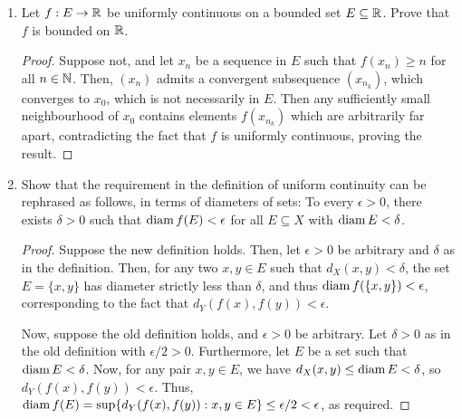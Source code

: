 \begin{enumerate}
\begin{proof}
    Notice that $\frac{ab}{a^2 + b^2} \le \frac{1}{2}$ since $(a - b)^2 = a^2 - 2ab + b^2 \ge 0$ for any $a, b$. Thus $f$ is bounded. Now, we have $g(1/n^3, 1/n) = n/2$ so $g$ is unbounded in any neighbourhood of $(0, 0)$. Finally, $f(1/n^2, 1/n) = 1/2$ for any $n$, so $f$ is discontinuous at $(0, 0)$. 

    However, if $x = cy$, $f(cy, y) = \frac{cy^3}{c^2y^2 + y^4} = \frac{cy}{c^2 + y^2} \to 0$ as $y \to 0$, so $f$ is continuous on the line $x = cy$. On any other line not passing through $(0, 0)$, the restriction is purely within the domain of the continuous definition. Similarly, $g(cy, y) = \frac{cy}{c^2 + y^4} \to 0$ as $y \to 0$, so $g$ is continuous on any straight line.
\end{proof}

\item %
    Let $f: E \rightarrow \mathbb{R}$ be uniformly continuous on a bounded set $E \subseteq \mathbb{R}$. Prove that $f$ is bounded on $\mathbb{R}$.
\begin{proof}
    Suppose not, and let $x_n$ be a sequence in $E$ such that $f(x_n) \ge n$ for all $n \in \mathbb{N}$. Then, $(x_n)$ admits a convergent subsequence $(x_{n_k})$, which converges to $x_0$, which is not necessarily in $E$. Then any sufficiently small neighbourhood of $x_0$ contains elements $f(x_{n_k})$ which are arbitrarily far apart, contradicting the fact that $f$ is uniformly continuous, proving the result.
\end{proof}

\item %
Show that the requirement in the definition of uniform continuity can be rephrased as follows, in terms of diameters of sets: To every $\epsilon > 0$, there exists $\delta > 0$ such that $\operatorname{diam} f(E) < \epsilon$ for all $E \subseteq X$ with $\operatorname{diam} E < \delta$.

\begin{proof}
    Suppose the new definition holds. Then, let $\epsilon > 0$ be arbitrary and $\delta$ as in the definition. Then, for any two $x, y \in E$ such that $d_X(x, y) < \delta$, the set $E = \{x, y\}$ has diameter strictly less than $\delta$, and thus $\operatorname{diam} f(\{x, y\}) < \epsilon$, corresponding to the fact that $d_Y(f(x), f(y)) < \epsilon$. 

    Now, suppose the old definition holds, and $\epsilon > 0$ be arbitrary. Let $\delta > 0$ as in the old definition with $\epsilon/2 > 0$. Furthermore, let $E$ be a set such that $\operatorname{diam} E < \delta$. Now, for any pair $x, y \in E$, we have $d_X(x, y) \le \operatorname{diam} E < \delta$, so $d_Y(f(x), f(y)) < \epsilon$. Thus, $\operatorname{diam} f(E) = \sup\{d_Y(f(x), f(y)): x, y \in E\} \le \epsilon/2 < \epsilon$, as required.
\end{proof}


\end{enumerate}
